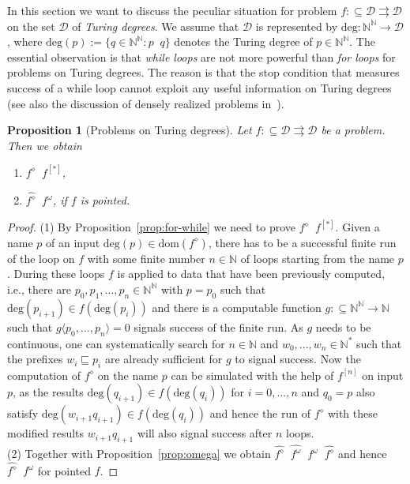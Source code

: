 \documentclass[11pt,a4paper]{amsart}
\theoremstyle{plain}
\newtheorem{prop}[thm]{Proposition}
\theoremstyle{definition}
\theoremstyle{defC}
\theoremstyle{thmC}
\theoremstyle{plain}
\numberwithin{equation}{section}
\def\deg{\mathrm{deg}}
\def\DD{{\mathcal D}}
\def\IN{{\mathbb{N}}}
\def\In{\subseteq}
\def\prefix{\sqsubseteq}
\def\mto{\rightrightarrows}
\def\equivT{\mathop{\equiv_{\mathrm{T}}}}
\def\leqSW{\mathop{\leq_{\mathrm{sW}}}}
\def\equivSW{\mathop{\equiv_{\mathrm{sW}}}}
\def\equivT{\mathop{\equiv_{\mathrm{T}}}}
\def\leqSW{\mathop{\leq_{\mathrm{sW}}}}
\def\equivSW{\mathop{\equiv_{\mathrm{sW}}}}
\def\dom{{\mathrm{dom}}}
\begin{document}
In this section we want to discuss the peculiar situation for problem $f:\In\DD\mto\DD$ on the set
$\DD$ of {\em Turing degrees}. We assume that $\DD$ is represented by $\deg:\IN^\IN\to\DD$,
where $\deg(p):=\{q\in\IN^\IN:p\equivT q\}$ denotes the Turing degree of $p\in\IN^\IN$.
The essential observation is that {\em while loops} are not more powerful than {\em for loops} for problems
on Turing degrees. The reason is that the stop condition that measures success of a while loop
cannot exploit any useful information on Turing degrees (see also the discussion of densely realized problems
in~\cite{BHK17a,BP18}).

\begin{prop}[Problems on Turing degrees]
\label{prop:Turing}
Let ${f:\In\DD\mto\DD}$ be a problem. Then we obtain 
\begin{enumerate}
\item $f^\diamond\equivSW f^{[*]}$,
\item $\widehat{f^\diamond}\equivSW f^\omega$, if $f$ is pointed.
\end{enumerate}
\end{prop}
\begin{proof}
(1) By Proposition~\ref{prop:for-while} we need to prove $f^\diamond\leqSW f^{[*]}$.
Given a name $p$ of an input $\deg(p)\in\dom(f^\diamond)$, there has to be a successful finite run of the loop on $f$
with some finite number $n\in\IN$ of loops starting from the name $p$. 
During these loops $f$ is applied to data that have been previously computed, i.e., there are
$p_0,p_1,...,p_n\in\IN^\IN$ with $p=p_0$ such that $\deg(p_{i+1})\in f(\deg(p_i))$ and there is a computable 
function $g:\In\IN^\IN\to\IN$
such that $g\langle p_0,...,p_n\rangle=0$ signals success of the finite run. As $g$ needs to be continuous,
one can systematically search for $n\in\IN$ and $w_0,...,w_n\in\IN^*$ such that
the prefixes $w_i\prefix p_i$ are already sufficient for $g$ to signal success.
Now the computation of $f^\diamond$ on the name $p$ can be simulated with 
the help of $f^{[n]}$ on input $p$, as the results $\deg(q_{i+1})\in f(\deg(q_i))$ for $i=0,...,n$ and $q_0=p$
also satisfy $\deg(w_{i+1}q_{i+1})\in f(\deg(q_i))$ and hence the run of $f^\diamond$ with these modified
results $w_{i+1}q_{i+1}$ will also signal success after $n$ loops. \\
(2) Together with Proposition~\ref{prop:omega} we obtain $\widehat{f^\diamond}\leqSW \widehat{f^\omega}\equivSW f^\omega\leqSW\widehat{f^\diamond}$ and hence $\widehat{f^\diamond}\equivSW f^\omega$ for pointed $f$.
\end{proof}
\end{document}
